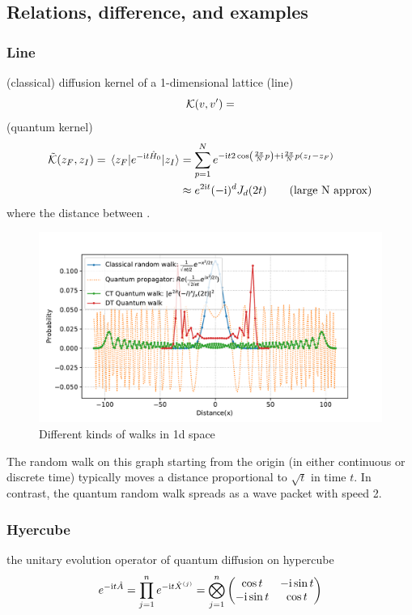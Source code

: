 \subsection{Relations, difference, and examples}
\subsubsection{Line}
(classical) diffusion kernel of a 1-dimensional lattice (line)
\begin{equation}
	\mathcal{K}(v,v') = 
\end{equation}
 (quantum kernel)
\begin{align}
	\tilde{\mathcal{K}}(z_F,z_I) = 
	\mel{z_F}{e^{-\textup{i}t\hat{H}_0 }}{z_I}
	&=\sum_{p=1}^{N} 
	e^{-\textup{i} t 2\cos(\frac{2\pi}{N}p) +\textup{i} \frac{2\pi}{N} p(z_I-z_F)} 
	\\
	&
	\approx e^{2\textup{i} t} (-\textup{i})^{d} J_{d} (2t)
	\tag{large N approx}
	\label{eq:ctqrw_kernel}
\end{align}
where the distance between .
\begin{figure}[!ht]
	\centering
	\includegraphics[width=.7\linewidth]{walk_propagator_1d.pdf}
	\caption{Different kinds of walks in 1d space}
\end{figure}
\begin{remark}
    The random walk on this graph starting from the origin (in either continuous or discrete time)
    typically moves a distance proportional to $\sqrt{t}$ in time $t$.
	In contrast, the quantum random walk spreads as a wave packet with speed 2.
\end{remark}

\subsubsection{Hyercube}
the unitary evolution operator of quantum diffusion on hypercube
\begin{equation}
	e^{-\textup{i} t \hat{A}} = 
	\prod_{j=1}^n e^{-\textup{i} t \hat{X}^{(j)} }
	= \bigotimes_{j=1}^n
	\begin{pmatrix}
		\cos t & -\textup{i} \sin t \\ 
		-\textup{i} \sin t & \cos t
	\end{pmatrix}
\end{equation}

